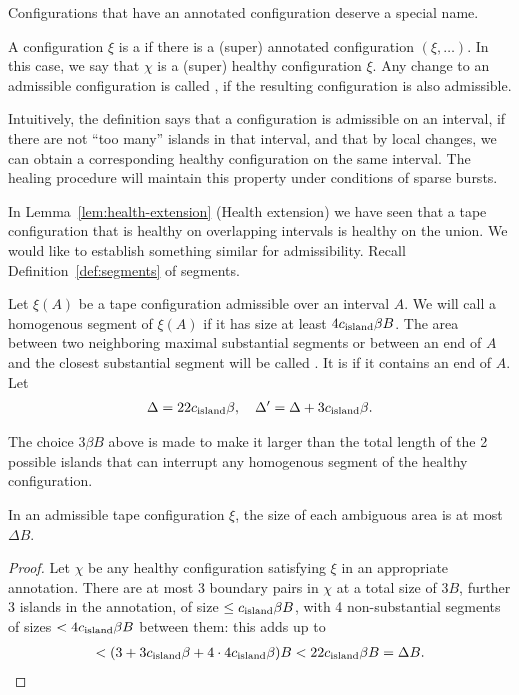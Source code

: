 \documentclass[12pt]{memoir}
\renewcommand{\le}{\leq}
\def\B{B}
\newcommand{\cns}[1]{c_{\textrm{\upshape #1}}}
\begin{document}
Configurations that have an annotated configuration deserve
a special name.

\begin{definition}
\label{def:admissible-config}
    A configuration \( \xi \) is a  if there is a (super)
    annotated configuration  \( (\xi,\dots) \).
    In this case, we say that \( \chi \) is a (super) healthy
    configuration  \( \xi \).
    Any change to an admissible configuration is called 
    , if the resulting configuration is also admissible.
\end{definition}

Intuitively, the definition says that a configuration is
admissible on an interval, if there are not ``too many'' islands
in that interval, and that by local changes, we can obtain
a corresponding healthy configuration on the same interval.
The healing procedure will maintain this property under conditions of sparse
bursts.

In Lemma~\ref{lem:health-extension} (Health extension) we have seen
that a tape configuration that is healthy on overlapping intervals is healthy
on the union.
We would like to establish something similar for admissibility.
Recall Definition~\ref{def:segments} of segments.

\begin{definition}\label{def:substantial}
Let \( \xi(A) \) be a tape configuration admissible over an interval \( A \).
We will call a homogenous segment of \( \xi(A) \)  if it has size 
at least \( 4\cns{island}\beta\B \).
The area between two neighboring maximal
substantial segments or between an end of \( A \) and the closest substantial segment
will be called .
It is  if it contains an end of \( A \).
  Let
 \begin{align*}
 \Delta=22\cns{island}\beta,\quad \Delta'=\Delta+3\cns{island}\beta. %
 \end{align*}
\end{definition}

The choice \( 3\beta\B \) above is made to make it larger than the total length of the
2 possible islands that can interrupt any homogenous segment of the healthy
configuration.

\begin{lemma}\label{lem:ambiguous}
  In an admissible tape 
configuration \( \xi \), the size of each ambiguous area is at most \( \Delta\B \).
\end{lemma}
\begin{proof}
Let \( \chi \) be any healthy configuration satisfying \( \xi \) in an appropriate annotation.
There are at most 3 boundary pairs in \( \chi \) at a total size of \( 3\B \), 
further 3 islands in the annotation, of size \( \le\cns{island}\beta\B \), with 4 
non-substantial segments of sizes \( < 4\cns{island}\beta\B \)
between them: this adds up to
\begin{align*}
 < (3+3\cns{island}\beta+ 4\cdot 4\cns{island}\beta)\B<22\cns{island}\beta\B=\Delta\B.
 \end{align*}
\end{proof}
\end{document}
